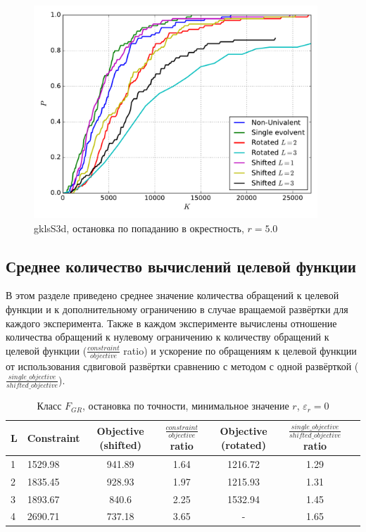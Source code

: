 \documentclass[a4paper]{article}
\begin{document}
\begin{figure}[H]
  \center
  \includegraphics[width=0.95\textwidth]{../gklsS3d/same_r/opt_point/gklsS3d_same_r_opt_pt_op.pdf}
  \caption{gklsS3d, остановка по попаданию в окрестность, $r=5.0$}
  \label{fig:}
\end{figure}

\subsection{Среднее количество вычислений целевой функции}
В этом разделе приведено среднее значение количества обращений к целевой функции и к дополнительному ограничению в случае
вращаемой развёртки для каждого эксперимента. Также в каждом эксперименте вычислены отношение
количества обращений к нулевому ограничению к количеству обращений к целевой функции ($\frac{constraint}{objective}$ ratio) и
ускорение по обращениям к целевой функции от использования сдвиговой развёртки сравнению с методом с одной развёрткой ($\frac{single\_objective}{shifted\_objective}$).

\begin{table}[H]
\begin{center}
\caption{Класс $F_{GR}$, остановка по точности, минимальное значение $r$, $\varepsilon_r=0$}
  \begin{tabular}{l|l*{5}{c}}
    \label{table:exp4}
  L & Constraint & Objective (shifted) & $\frac{constraint}{objective}$ ratio & Objective (rotated) & $\frac{single\_objective}{shifted\_objective}$ ratio \\
  \hline
  1 & 1529.98 & 941.89 & 1.64 & 1216.72 & 1.29 \\
  2 & 1835.45 & 928.93 & 1.97 & 1215.93 & 1.31 \\
  3 & 1893.67 & 840.6  & 2.25 & 1532.94 & 1.45 \\
  4 & 2690.71 & 737.18 & 3.65 &  - & 1.65 \\
  \end{tabular}
\end{center}
\end{table}
\end{document}
